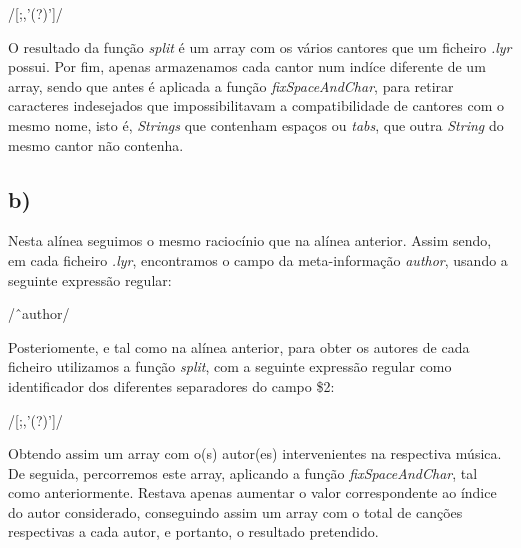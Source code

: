 \documentclass[12pt,a4paper]{report}
\begin{document}
\begin{center}
\vspace{0.3cm}
/[;,'(?)']/ \par
\vspace{0.3cm}
\end{center}

\noindent O resultado da função \emph{split} é um array com os vários cantores que um ficheiro \emph{.lyr} possui. Por fim, apenas armazenamos cada cantor num indíce diferente de um array, sendo que antes é aplicada a função \emph{fixSpaceAndChar}, para retirar caracteres indesejados que impossibilitavam a compatibilidade de cantores com o mesmo nome, isto é, \emph{Strings} que contenham espaços ou \emph{tabs}, que outra \emph{String} do mesmo cantor não contenha. 
 

\subsection{b)}
Nesta alínea seguimos o mesmo raciocínio que na alínea anterior. Assim sendo, em cada ficheiro \emph{.lyr}, encontramos o campo da meta-informação \emph{author}, usando a seguinte expressão regular: \par

\begin{center}
\vspace{0.3cm}
/\^\ author/ \par
\vspace{0.3cm}
\end{center}

\noindent Posteriomente, e tal como na alínea anterior, para obter os autores de cada ficheiro utilizamos a função \emph{split}, com a seguinte expressão regular como identificador dos diferentes separadores do campo \$2:

\begin{center}
\vspace{0.3cm}
/[;,'(?)']/ \par
\vspace{0.3cm}
\end{center}

\noindent Obtendo assim um array com o(s) autor(es) intervenientes na respectiva música. De seguida, percorremos este array, aplicando a função \emph{fixSpaceAndChar}, tal como anteriormente. Restava apenas aumentar o valor correspondente ao índice do autor considerado, conseguindo assim um array com o total de canções respectivas a cada autor, e portanto, o resultado pretendido.
\end{document}
